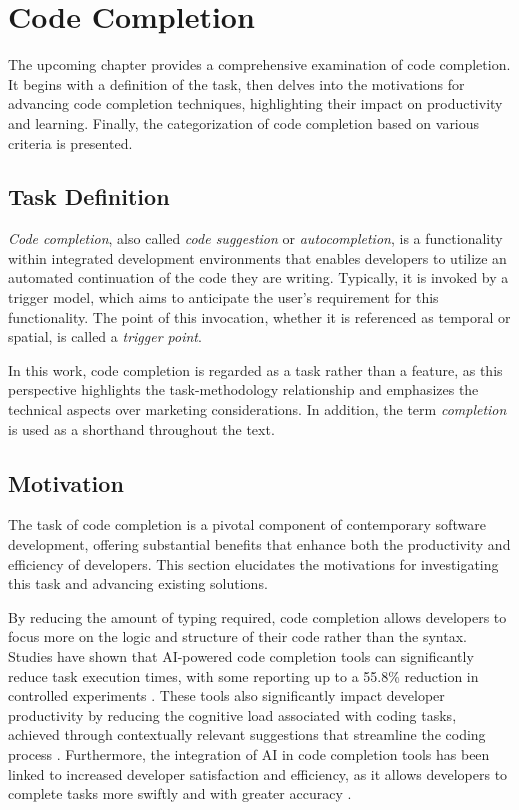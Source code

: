 \chapter{Code Completion}\label{chap:code-completion}

The upcoming chapter provides a comprehensive examination of code completion. It begins with a definition of the task, then delves into the motivations for advancing code completion techniques, highlighting their impact on productivity and learning. Finally, the categorization of code completion based on various criteria is presented.

\section{Task Definition}

\textit{Code completion}, also called \textit{code suggestion} or \textit{autocompletion}, is a functionality within integrated development environments that enables developers to utilize an automated continuation of the code they are writing. Typically, it is invoked by a trigger model, which aims to anticipate the user's requirement for this functionality. The point of this invocation, whether it is referenced as temporal or spatial, is called a \textit{trigger point}.

In this work, code completion is regarded as a task rather than a feature, as this perspective highlights the task-methodology relationship and emphasizes the technical aspects over marketing considerations. In addition, the term \textit{completion} is used as a shorthand throughout the text.

\section{Motivation}

The task of code completion is a pivotal component of contemporary software development, offering substantial benefits that enhance both the productivity and efficiency of developers. This section elucidates the motivations for investigating this task and advancing existing solutions.

By reducing the amount of typing required, code completion allows developers to focus more on the logic and structure of their code rather than the syntax. Studies have shown that AI-powered code completion tools can significantly reduce task execution times, with some reporting up to a 55.8\% reduction in controlled experiments \parencite{peng2023}. These tools also significantly impact developer productivity by reducing the cognitive load associated with coding tasks, achieved through contextually relevant suggestions that streamline the coding process \parencite{weber2024}. Furthermore, the integration of AI in code completion tools has been linked to increased developer satisfaction and efficiency, as it allows developers to complete tasks more swiftly and with greater accuracy \parencite{bakal2025}.

